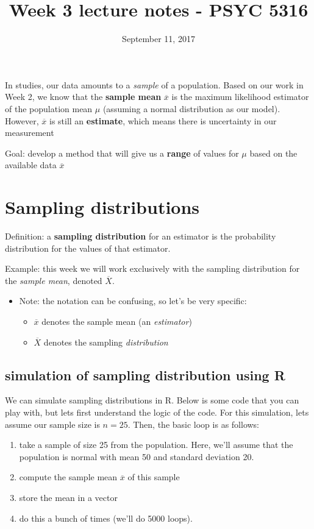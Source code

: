 \documentclass[11pt]{article}
\date{September 11, 2017}
\title{Week 3 lecture notes - PSYC 5316}
\begin{document}
\maketitle
In studies, our data amounts to a \emph{sample} of a population.  Based on our work in Week 2, we know that the \textbf{sample mean} $\overline{x}$ is the maximum likelihood estimator of the population mean $\mu$ (assuming a normal distribution as our model).  However, $\overline{x}$ is still an \textbf{estimate}, which means there is uncertainty in our measurement

Goal: develop a method that will give us a \textbf{range} of values for $\mu$ based on the available data $\overline{x}$

\section*{Sampling distributions}
\label{sec-1}

Definition: a \textbf{sampling distribution} for an estimator is the probability distribution for the values of that estimator.

Example: this week we will work exclusively with the sampling distribution for the \emph{sample mean}, denoted $\overline{X}$.
\begin{itemize}
\item Note: the notation can be confusing, so let's be very specific:
\begin{itemize}
\item $\overline{x}$ denotes the sample mean (an \emph{estimator})
\item $\overline{X}$ denotes the sampling \emph{distribution}
\end{itemize}
\end{itemize}


\subsection*{simulation of sampling distribution using R}
\label{sec-1-1}

We can simulate sampling distributions in R.  Below is some code that you can play with, but lets first understand the logic of the code.  For this simulation, lets assume our sample size is $n=25$.  Then, the basic loop is as follows:

\begin{enumerate}
\item take a sample of size 25 from the population.  Here, we'll assume that the population is normal with mean 50 and standard deviation 20.

\item compute the sample mean $\overline{x}$ of this sample
\item store the mean in a vector
\item do this a bunch of times (we'll do 5000 loops).
\end{enumerate}
\end{document}
